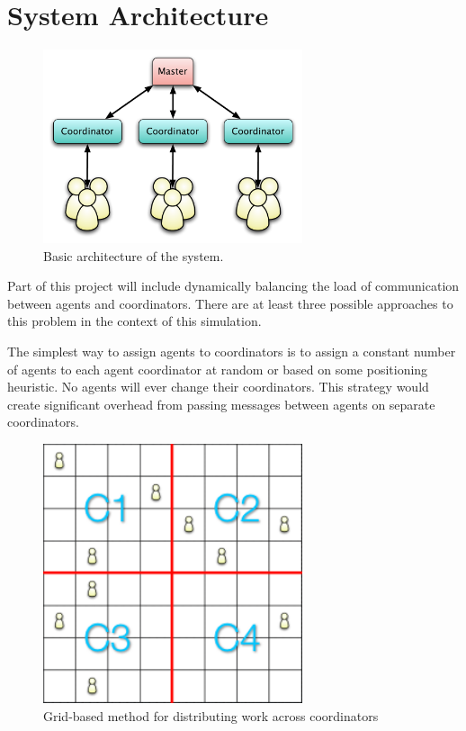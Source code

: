 \section{System Architecture}

\begin{figure}[h!]
    \begin{center}
        \includegraphics[width=3in]{figures/arch0.pdf}
    \end{center}
    \caption{Basic architecture of the system.}
    \label{arch}
\end{figure}

Part of this project will include dynamically balancing the load of communication between agents and
coordinators. There are at least three possible approaches to this problem in the context of this
simulation.

The simplest way to assign agents to coordinators is to assign a constant number of agents to each
agent coordinator at random or based on some positioning heuristic. No agents will ever change their
coordinators. This strategy would create significant overhead from passing messages between agents
on separate coordinators.

\begin{figure}[h!]
    \begin{center}
        \includegraphics[width=3in]{figures/arch1.png}
    \end{center}
    \caption{Grid-based method for distributing work across coordinators}
    \label{geoarch}
\end{figure}

